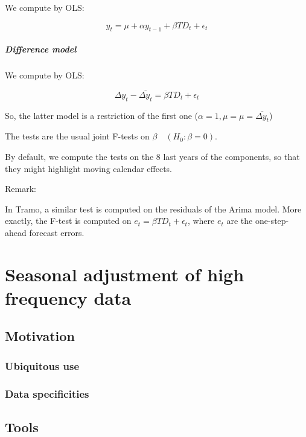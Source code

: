 \documentclass[
  letterpaper,
  DIV=11,
  numbers=noendperiod]{scrreprt}
\let\oldparagraph\paragraph
\renewcommand{\paragraph}[1]{\oldparagraph{#1}\mbox{}}
\begin{document}
We compute by OLS:

\[y_t=\mu + \alpha y_{t-1} + \beta TD_t + \epsilon_t \]

\hypertarget{difference-model}{%
\paragraph{Difference model}\label{difference-model}}

We compute by OLS:

\[\Delta y_t - \overline{\Delta y_t}=\beta TD_t + \epsilon_t \]

So, the latter model is a restriction of the first one
(\(\alpha =1, \mu =μ=\overline{\Delta y_t}\))

The tests are the usual joint F-tests on \(\beta \quad (H_0:\beta=0)\).

By default, we compute the tests on the 8 last years of the components,
so that they might highlight moving calendar effects.

Remark:

In Tramo, a similar test is computed on the residuals of the Arima
model. More exactly, the F-test is computed on
\(e_t=\beta TD_t + \epsilon_t\), where \(e_t\) are the one-step-ahead
forecast errors.

\hypertarget{seasonal-adjustment-of-high-frequency-data-1}{%
\chapter{Seasonal adjustment of high frequency
data}\label{seasonal-adjustment-of-high-frequency-data-1}}

\hypertarget{motivation-2}{%
\section{Motivation}\label{motivation-2}}

\hypertarget{ubiquitous-use}{%
\subsection{Ubiquitous use}\label{ubiquitous-use}}

\hypertarget{data-specificities}{%
\subsection{Data specificities}\label{data-specificities}}

\hypertarget{tools-3}{%
\section{Tools}\label{tools-3}}
\end{document}
